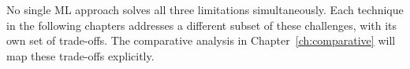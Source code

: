 \begin{keyinsight}
    No single ML approach solves all three limitations simultaneously.
    Each technique in the following chapters addresses a different subset
    of these challenges, with its own set of trade-offs.  The comparative
    analysis in Chapter~\ref{ch:comparative} will map these trade-offs
    explicitly.
\end{keyinsight}
